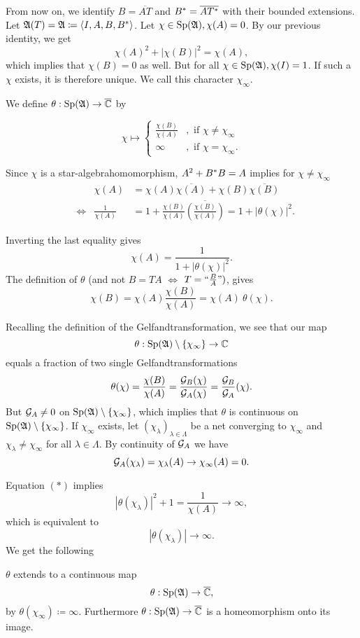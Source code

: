 From now on, we identify $B=\overline{AT}$ and $B^{*} =\overline{AT^{*}}$
with their bounded extensions.
Let $\mathfrak{A} (T) = \mathfrak{A} \coloneqq \left\langle I, A, B , B^{*} \right\rangle$. Let $ \chi \in \operatorname{Sp} (\mathfrak{A})
, \chi(A) =0$. By our previous identity, we get
\[
 \chi(A)^2 + |\chi(B)|^2 = \chi(A),
\]
which implies that $\chi(B) =0$ as well. But for all $\chi \in \operatorname{Sp} (\mathfrak{A}), 
\chi(I)=1$. If such a $\chi$ exists, it is therefore unique. We call this
character $\chi_\infty$.

We define $\theta : \operatorname{Sp} (\mathfrak{A}) \to {\overline{\mathbb{C}}}$ by

 \[
 \chi \mapsto 
  \begin{cases}
    \frac{\chi(B)}{\chi(A)} &, \text{ if }\chi \neq \chi_\infty\\
    \infty &, \text{ if } \chi = \chi_\infty.
    \end{cases}
 \]
 
 Since $\chi$ is a star-algebrahomomorphism, $A^2 + B^{*} B = A$ implies for
 $\chi \neq \chi_\infty$
 \begin{align*}
  &  & \chi(A) &= \chi(A) \overline{\chi(A)} + \chi(B) \overline{\chi(B)} \\
  &\Leftrightarrow& \frac{1}{\chi(A)} &= 1 + \frac{\chi(B)}{\chi(A)} 
  \overline{\left( \frac{\chi(B)}{\chi(A)} \right)} = 1 + | \theta(\chi)|^2. 
 \end{align*}
 


Inverting the last equality gives
\[
 \chi(A) = \frac{1}{1 + |\theta (\chi)|^2} \tag{$\ast$}.
\]
The definition of $\theta$ (and not $B= TA$ $\Leftrightarrow$ $T = 
`` \frac{B}{A} ")$, gives
\[
 \chi(B) = \chi(A) \frac{\chi(B)}{\chi(A)}= \chi(A)~ \theta(\chi) 
 \tag{$\ast \ast$}.
\]

Recalling the definition of the Gelfandtransformation, we see that our map
\[
 \theta : \operatorname{Sp}(\mathfrak{A}) \setminus \left\lbrace\chi_\infty\right\rbrace \to \mathbb{C}
\]
equals a fraction of two single Gelfandtransformations
\[
 \theta(\chi) = \frac{\chi(B)}{\chi(A)} = \frac{\mathcal{G}_B (\chi)}{\mathcal{G}_A (\chi)}=
 \frac{\mathcal{G}_B}{\mathcal{G}_A}(\chi).
\]
But $\mathcal{G}_A \neq 0$ on $\operatorname{Sp}(\mathfrak{A}) \setminus \left\lbrace\chi_\infty\right\rbrace$, which implies
that $\theta$ is continuous on $\operatorname{Sp}(\mathfrak{A}) \setminus \left\lbrace\chi_\infty\right\rbrace$.
If $\chi_\infty$ exists, let $ \left( \chi_\lambda \right) 
_{\lambda \in \Lambda}$ be a net converging to $\chi_\infty$ and 
$\chi_\lambda \neq \chi_\infty$ for all $\lambda \in \Lambda$. 
By continuity of $\mathcal{G}_A$ we have
\[
 \mathcal{G}_A (\chi_\lambda) = \chi_\lambda (A) \to \chi_\infty (A) = 0.
\]

Equation $(\ast)$ implies
\[
 | \theta( \chi_\lambda ) | ^2  + 1 = \frac{1}{\chi(A)} \to \infty,
\]
which is equivalent to 
\[
 | \theta (\chi_\lambda ) | \to \infty.
\]
We get the following 
\begin{lem}
$\theta$ extends to a continuous map
\[
 \theta : \operatorname{Sp}(\mathfrak{A}) \to {\overline{\mathbb{C}}},
\]
by $\theta (\chi_\infty) \coloneqq \infty$.
Furthermore $\theta : \operatorname{Sp} (\mathfrak{A}) \to {\overline{\mathbb{C}}}$ is a homeomorphism onto its image.
\end{lem}

